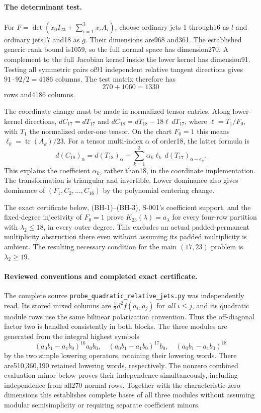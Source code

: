 \paragraph{The determinant test.}
For $F=\det(x_0I_{23}+\sum_{i=1}^3x_iA_i)$, choose ordinary jets
1 through16 as $l$ and ordinary jets17 and18 as $g$.  Their dimensions
are968 and361.  The established generic rank bound is1059, so the
full normal space has dimension270.  A complement to the full
Jacobian kernel inside the lower kernel has dimension91.  Testing
all symmetric pairs of91 independent relative tangent directions
gives $91\cdot92/2=4186$ columns.  The test matrix therefore has
\[
                         270+1060=1330
\]
rows and4186 columns.

The coordinate change must be made in normalized tensor entries.
Along lower-kernel directions, $dC_{17}=dT_{17}$ and
$dC_{18}=dT_{18}-18\ell\,dT_{17}$, where
$\ell=T_1/F_0$, with $T_1$ the normalized order-one tensor.
On the chart $F_0=1$ this means
$\ell_k=\operatorname{tr}(A_k)/23$.
For a tensor multi-index $\alpha$ of order18,
the latter formula is
\[
 d(C_{18})_\alpha=d(T_{18})_\alpha
      -\sum_{k=1}^3\alpha_k\ell_k\,d(T_{17})_{\alpha-e_k}.
\]
This explains the coefficient $\alpha_k$, rather than18, in the
coordinate implementation.  The transformation is triangular and
invertible.  Lower dominance also gives dominance of
$(F_1,C_2,\ldots,C_{16})$ by the polynomial centering change.

The exact certificate below, (BH-1)--(BH-3), S-001's
coefficient support, and the fixed-degree injectivity of $F_0=1$
prove $K_{23}(\lambda)=a_\lambda$ for every four-row partition
with $\lambda_2\leq18$, in every outer degree.  This excludes an
actual padded-permanent multiplicity obstruction there even without
assuming its padded multiplicity is ambient.  The resulting necessary
condition for the main $(17,23)$ problem is $\lambda_2\geq19$.

\paragraph{Reviewed conventions and completed exact certificate.}
The complete source \texttt{probe\_quadratic\_relative\_jets.py}
was independently read.  Its stored mixed columns are
$\tfrac12d^2f(a_i,a_j)$ for \emph{all} $i\leq j$, and its quadratic
module rows use the same bilinear polarization convention.  Thus
the off-diagonal factor two is handled consistently in both blocks.
The three modules are generated from the integral highest symbols
\[
 (a_0b_1-a_1b_0)^{16}a_0b_0,\quad
 (a_0b_1-a_1b_0)^{17}b_0,\quad
 (a_0b_1-a_1b_0)^{18}
\]
by the two simple lowering operators, retaining their lowering words.
There are510,360,190 retained lowering words, respectively.  The
nonzero combined evaluation minor below proves their independence
simultaneously, including independence from all270 normal rows.
Together with the characteristic-zero dimensions this establishes
complete bases of all three modules without assuming modular
semisimplicity or requiring separate coefficient minors.

